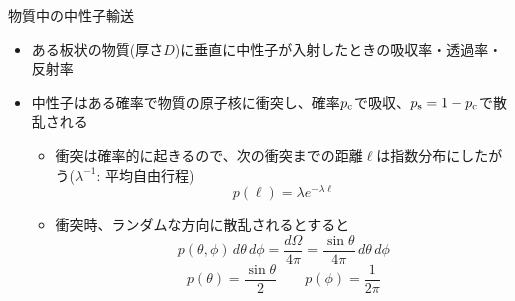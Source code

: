 \begin{frame}[t,fragile]{物質中の中性子輸送}
  \begin{itemize}
  \item ある板状の物質(厚さ$D$)に垂直に中性子が入射したときの吸収率・透過率・反射率
  \item 中性子はある確率で物質の原子核に衝突し、確率$p_{\rm c}$で吸収、$p_{\rm s}=1-p_{\rm c}$で散乱される
    \begin{itemize}
    \item 衝突は確率的に起きるので、次の衝突までの距離$\ell$は指数分布にしたがう($\lambda^{-1}$: 平均自由行程)
      \[
      p(\ell) = \lambda e^{-\lambda\ell}
      \]
    \item 衝突時、ランダムな方向に散乱されるとすると
      \[
      p(\theta,\phi) \, d\theta \, d\phi = \frac{d\Omega}{4\pi} = \frac{\sin \theta}{4\pi} \, d\theta \, d\phi
      \]
      \[
      p(\theta) = \frac{\sin \theta}{2} \qquad p(\phi)=\frac{1}{2\pi}
      \]
    \end{itemize}
  \end{itemize}
\end{frame}
